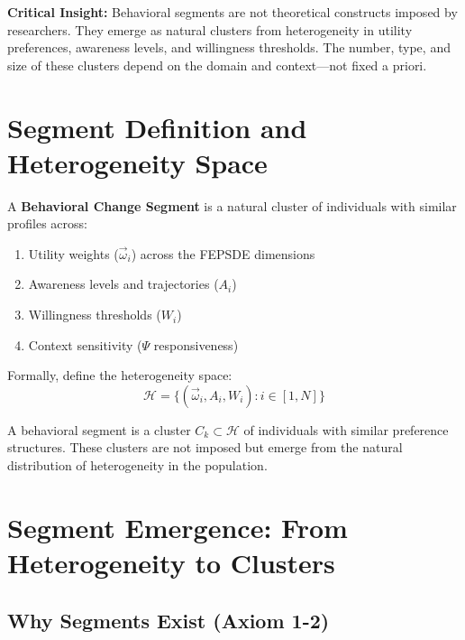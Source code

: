 \textbf{Critical Insight:} Behavioral segments are not theoretical constructs imposed
by researchers. They emerge as natural clusters from heterogeneity in utility
preferences, awareness levels, and willingness thresholds. The number, type, and
size of these clusters depend on the domain and context---not fixed a priori.

\section{Segment Definition and Heterogeneity Space}

A \textbf{Behavioral Change Segment} is a natural cluster of individuals with
similar profiles across:

\begin{enumerate}
    \item Utility weights ($\vec{\omega}_i$) across the FEPSDE dimensions
    \item Awareness levels and trajectories ($A_i$)
    \item Willingness thresholds ($W_i$)
    \item Context sensitivity ($\Psi$ responsiveness)
\end{enumerate}

Formally, define the heterogeneity space:
\begin{equation}
\mathcal{H} = \{ (\vec{\omega}_i, A_i, W_i) : i \in [1,N] \}
\end{equation}

A behavioral segment is a cluster $C_k \subset \mathcal{H}$ of individuals with
similar preference structures. These clusters are not imposed but emerge from
the natural distribution of heterogeneity in the population.

\section{Segment Emergence: From Heterogeneity to Clusters}
\label{sec:segment-emergence}

\subsection{Why Segments Exist (Axiom 1-2)}

